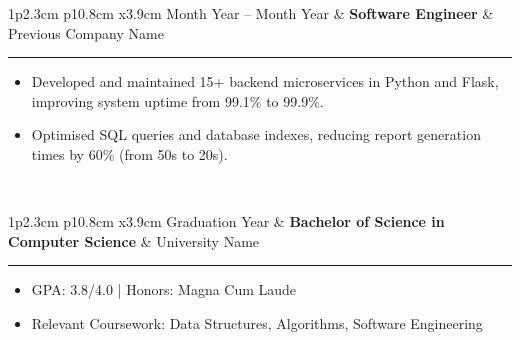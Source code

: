\documentclass[10pt,a4paper]{article}
\newcommand{\mystrut}{\rule[-.3\baselineskip]{0pt}{\baselineskip}}
\newcommand{\larrow}{$\blacktriangleright$\ }
\newcommand{\cvsection}[1]{
    \vspace{8pt}
    \colorbox{sectcol}{\mystrut \makebox[1\linewidth][l]{
        \textcolor{white}{\ \larrow \textbf{#1}}
    }}\\
    \vspace{-4pt}
}
\newcommand{\cvevent}[3]{
    \vspace{6pt}
    \begin{tabular*}{1\textwidth}{p{2.3cm} p{10.8cm} x{3.9cm}}
        \textcolor{bgcol}{#1} & \textbf{#2} & \vspace{2.5pt}\textcolor{sectcol}{#3}
    \end{tabular*}
    \vspace{-12pt}
    \textcolor{softcol}{\hrule}
    \vspace{4pt}
}
\begin{document}
\cvevent{Month Year -- Month Year}{Software Engineer}{Previous Company Name}
\begin{itemize}
    \item Developed and maintained 15+ backend microservices in Python and Flask, improving system uptime from 99.1\% to 99.9\%.
    \item Optimised SQL queries and database indexes, reducing report generation times by 60\% (from 50s to 20s).
\end{itemize}
\vspace{4pt}

\cvsection{Education}

\cvevent{Graduation Year}{Bachelor of Science in Computer Science}{University Name}
\begin{itemize}
    \item GPA: 3.8/4.0 | Honors: Magna Cum Laude
    \item Relevant Coursework: Data Structures, Algorithms, Software Engineering
\end{itemize}

\null
\vspace*{\fill}
\hspace{-0.25\linewidth}\colorbox{bgcol}{\makebox[1.5\linewidth][c]{
    \mystrut \small \textcolor{white}{[Portfolio Link]} $\cdot$ \textcolor{white}{[GitHub Link]}
}}
\end{document}
